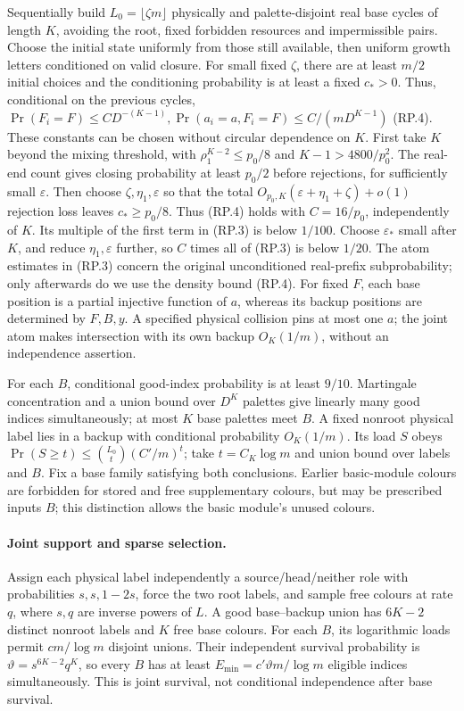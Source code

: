 Sequentially build $L_0=\lfloor\zeta{}m\rfloor$ physically and palette-disjoint real base cycles of length $K$, avoiding the root, fixed forbidden resources and impermissible pairs.  Choose the
initial state uniformly from those still available, then uniform
growth letters conditioned on valid closure.  For small fixed $\zeta$, there are at least $m/2$ initial choices and the conditioning probability is at least a fixed $c_*>0$.  Thus, conditional on the previous cycles, $\Pr(F_i=F)\le{}CD^{-(K-1)},\Pr(a_i=a,F_i=F)\le{}C/(mD^{K-1})$ \textup{(RP.4)}. These constants can be chosen without circular dependence on $K$. First take $K$ beyond the mixing threshold, with $\rho_1^{K-2}\le{}p_0/8$ and $K-1>4800/p_0^2$. The real-end count gives closing probability at least $p_0/2$ before rejections, for sufficiently small $\varepsilon$. Then choose $\zeta,\eta_1,\varepsilon$ so that the total $O_{p_0,K}(\varepsilon+\eta_1+\zeta)+o(1)$ rejection loss leaves $c_*\ge{}p_0/8$. Thus (RP.4) holds with $C=16/p_0$, independently of $K$. Its multiple of the first term in (RP.3) is below $1/100$. Choose $\varepsilon_*$ small after $K$, and reduce $\eta_1,\varepsilon$ further, so $C$ times all of (RP.3) is below $1/20$. The atom estimates in (RP.3) concern the original unconditioned real-prefix subprobability; only afterwards do we
use the density bound (RP.4).  For fixed $F$, each base position is a partial injective function of $a$, whereas its backup positions are determined by $F,B,y$.  A specified physical collision pins at most one $a$; the joint atom makes intersection with its own backup $O_K(1/m)$, without an independence assertion.

For each $B$, conditional good-index probability is at least $9/10$. Martingale concentration and a union bound over $D^K$ palettes give linearly many good indices simultaneously; at most $K$ base palettes meet $B$.  A fixed nonroot physical label lies in a backup with conditional probability $O_K(1/m)$.  Its load $S$ obeys $\Pr(S\ge{}t)\le\binom{L_0}{t}(C'/m)^t$; take $t=C_K\log{}m$ and union bound over labels and $B$.  Fix a base family satisfying both conclusions.  Earlier basic-module colours are forbidden for
stored and free supplementary colours, but may be prescribed inputs $B$; this distinction allows the basic module's unused colours.

\paragraph{Joint support and sparse selection.}
Assign each physical label independently a source/head/neither role
with probabilities $s,s,1-2s$, force the two root labels, and sample free colours at rate $q$, where $s,q$ are inverse powers of $L$. A good base--backup union has $6K-2$ distinct nonroot labels and $K$ free base colours.  For each $B$, its logarithmic loads permit $cm/\log{}m$ disjoint unions.  Their independent survival probability is $\vartheta=s^{6K-2}q^K$, so every $B$ has at least $E_{\min}=c'\vartheta{}m/\log{}m$ eligible indices simultaneously. This is joint survival, not conditional independence after base survival.

